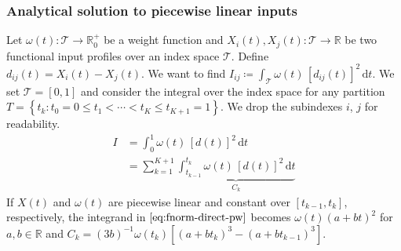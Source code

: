 \documentclass{snedecorbeamer}
\begin{document}
\begin{frame}%
  \label{frm:piecewise}
  \frametitle{Analytical solution to piecewise linear inputs}

  \newcommand{\calT}{\mathcal{T}}
  \newcommand{\dt}{\, \mathrm{d}t}
  \newcommand{\du}{\, \mathrm{d}u}
  \newcommand{\dv}{\, \mathrm{d}v}
  \newcommand{\w}{\omega}
  \newcommand{\dotsq}{{\left[d(t)\right]}^2}
  \newcommand{\fall}{\,~\forall~\,}

  Let $\w(t): \calT \to \mathbb{R}_0^+$ be a weight function and $X_i(t),
  X_j(t): \calT \to \mathbb{R}$ be two functional input profiles over an index
  space $\calT$. Define $d_{ij}(t) = X_i(t) - X_j(t)$. We want to find $ I_{ij}
  \coloneqq \int_{\calT} \w(t) \, {\left[d_{ij}(t)\right]}^2 \dt$. We set
  $\calT = [0, 1]$ and consider the integral over the index space for any
  partition $T = \left\{ t_k: t_0 = 0 \le t_1 < \cdots < t_K \le t_{K+1} = 1
  \right\}$. We drop the subindexes $i$, $j$ for readability.
  \begin{align}
  I
  &=\int_0^1 \w(t) \, \dotsq \dt \label{eq:fnorm-direct} \\
  &=\sum_{k = 1}^{K + 1}
    \underbrace{
    \int_{t_{k-1}}^{t_k} \w(t) \, \dotsq
    \dt}_{C_k} \label{eq:fnorm-direct-pw}
  \end{align}
  If $X(t)$ and $\omega(t)$ are piecewise linear and constant over $[t_{k-1},
  t_{k}]$, respectively, the integrand in $\cref{eq:fnorm-direct-pw}$ becomes
  $\omega(t) {(a + bt)}^2$ for $a,b\in\mathbb{R}$ and $C_k =
  {(3b)}^{-1}\omega(t_k)
  \left[
    {(a + b t_k)}^3 -
    {(a + b t_{k-1})}^3
  \right]
  $.
\end{frame}
\end{document}
